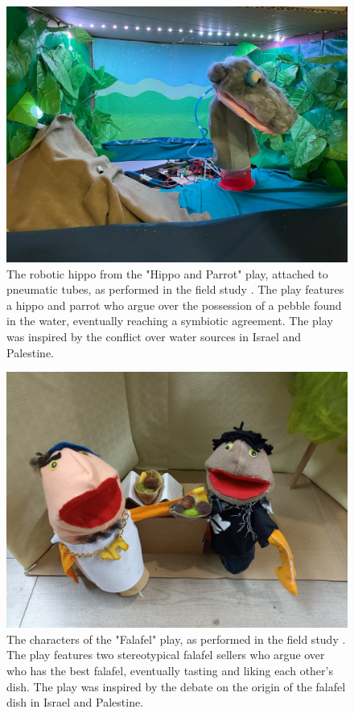 \documentclass[dissertation,math,vertlayout,pdfa,colorlinks]{aaltoseries}
\begin{document}
\begin{figure}
    \includegraphics[width=1\linewidth]{hippo.jpg}
    \caption{The robotic hippo from the "Hippo and Parrot" play, attached to pneumatic tubes, as performed in the field study \cite{peledTeleroboticTheaterOppressed2025}. The play features a hippo and parrot who argue over the possession of a pebble found in the water, eventually reaching a symbiotic agreement. The play was inspired by the conflict over water sources in Israel and Palestine.}
    \label{fig:hippo}
\end{figure}

\begin{figure}
    \includegraphics[width=1\linewidth]{falafel-highres.jpg}
    \caption{The characters of the "Falafel" play, as performed in the field study \cite{peledTeleroboticTheaterOppressed2025}. The play features two stereotypical falafel sellers who argue over who has the best falafel, eventually tasting and liking each other's dish. The play was inspired by the debate on the origin of the falafel dish in Israel and Palestine.}
    \label{fig:falafel}
\end{figure}
\end{document}
